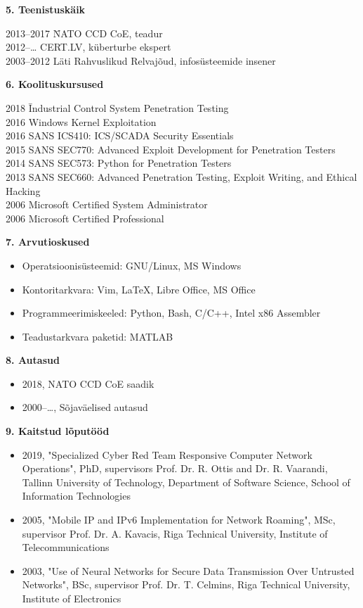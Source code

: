 \textbf{5. Teenistusk\"aik}
\begin{tabbing}
2013--2017 \quad\quad \= NATO CCD CoE, teadur\\
2012--\ldots \> CERT.LV, küberturbe ekspert\\
2003--2012   \> Läti Rahvuslikud Relvajõud, infosüsteemide insener\\
\end{tabbing}

\textbf{6. Koolituskursused}
\begin{tabbing}
2018 \quad\quad \= Industrial Control System Penetration Testing \\
2016 \> Windows Kernel Exploitation \\
2016 \> SANS ICS410: ICS/SCADA Security Essentials \\
2015 \> SANS SEC770: Advanced Exploit Development for Penetration Testers \\
2014 \> SANS SEC573: Python for Penetration Testers \\
2013 \> SANS SEC660: Advanced Penetration Testing, Exploit Writing, and Ethical Hacking \\
2006 \> Microsoft Certified System Administrator\\
2006 \> Microsoft Certified Professional\\
\end{tabbing}
\newpage

\textbf{7. Arvutioskused}
\begin{itemize}
\item Operatsioonis\"{u}steemid: GNU/Linux, MS Windows
\item Kontoritarkvara: Vim, LaTeX, Libre Office, MS Office
\item Programmeerimiskeeled: Python, Bash, C/C++, Intel x86 Assembler
\item Teadustarkvara paketid: MATLAB
\end{itemize}

\textbf{8. Autasud}
\begin{itemize}
\item 2018, NATO CCD CoE saadik
\item 2000--\ldots, Sõjaväelised autasud
\end{itemize}

\textbf{9. Kaitstud l\~oput\"o\"od} 
\begin{itemize}
\item 2019, "Specialized Cyber Red Team Responsive Computer Network Operations", PhD, supervisors Prof. Dr. R. Ottis and Dr. R. Vaarandi, Tallinn University of Technology, Department of Software Science, School of Information Technologies
\item 2005, "Mobile IP and IPv6 Implementation for Network Roaming", MSc, supervisor Prof. Dr. A. Kavacis, Riga Technical University, Institute of Telecommunications
\item 2003, "Use of Neural Networks for Secure Data Transmission Over Untrusted Networks", BSc, supervisor Prof. Dr. T. Celmins, Riga Technical University, Institute of Electronics
\end{itemize}

